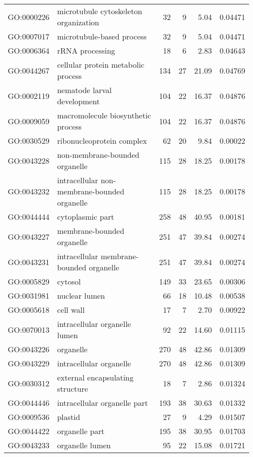 \begin{longtable}{lp{4.5cm}rrrl}
  GO:0000226 & microtubule cytoskeleton organization &  32 &   9 & 5.04 & 0.04471 \\ 
  GO:0007017 & microtubule-based process &  32 &   9 & 5.04 & 0.04471 \\ 
  GO:0006364 & rRNA processing &  18 &   6 & 2.83 & 0.04643 \\ 
  GO:0044267 & cellular protein metabolic process & 134 &  27 & 21.09 & 0.04769 \\ 
  GO:0002119 & nematode larval development & 104 &  22 & 16.37 & 0.04876 \\ 
  GO:0009059 & macromolecule biosynthetic process & 104 &  22 & 16.37 & 0.04876 \\ 
  GO:0030529 & ribonucleoprotein complex &  62 &  20 & 9.84 & 0.00022 \\ 
  GO:0043228 & non-membrane-bounded organelle & 115 &  28 & 18.25 & 0.00178 \\ 
  GO:0043232 & intracellular non-membrane-bounded organelle & 115 &  28 & 18.25 & 0.00178 \\ 
  GO:0044444 & cytoplasmic part & 258 &  48 & 40.95 & 0.00181 \\ 
  GO:0043227 & membrane-bounded organelle & 251 &  47 & 39.84 & 0.00274 \\ 
  GO:0043231 & intracellular membrane-bounded organelle & 251 &  47 & 39.84 & 0.00274 \\ 
  GO:0005829 & cytosol & 149 &  33 & 23.65 & 0.00306 \\ 
  GO:0031981 & nuclear lumen &  66 &  18 & 10.48 & 0.00538 \\ 
  GO:0005618 & cell wall &  17 &   7 & 2.70 & 0.00922 \\ 
  GO:0070013 & intracellular organelle lumen &  92 &  22 & 14.60 & 0.01115 \\ 
  GO:0043226 & organelle & 270 &  48 & 42.86 & 0.01309 \\ 
  GO:0043229 & intracellular organelle & 270 &  48 & 42.86 & 0.01309 \\ 
  GO:0030312 & external encapsulating structure &  18 &   7 & 2.86 & 0.01324 \\ 
  GO:0044446 & intracellular organelle part & 193 &  38 & 30.63 & 0.01332 \\ 
  GO:0009536 & plastid &  27 &   9 & 4.29 & 0.01507 \\ 
  GO:0044422 & organelle part & 195 &  38 & 30.95 & 0.01703 \\ 
  GO:0043233 & organelle lumen &  95 &  22 & 15.08 & 0.01721 \\ 

\end{longtable}
